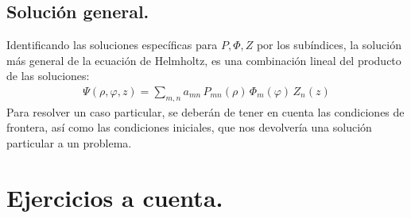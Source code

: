 \subsection{Solución general.}

Identificando las soluciones específicas para $P, \Phi, Z$ por los subíndices, la solución más general de la ecuación de Helmholtz, es una combinación lineal del producto de las soluciones:
\begin{align}
\Psi (\rho, \varphi, z) =  \sum_{m,n} a_{mn} \, P_{mn}(\rho) \, \Phi_{m}(\varphi) \, Z_{n}(z)
\label{eq:ecuacion_09_56}
\end{align}
Para resolver un caso particular, se deberán de tener en cuenta las condiciones de frontera, así como las condiciones iniciales, que nos devolvería una solución particular a un problema.

\section{Ejercicios a cuenta.}

